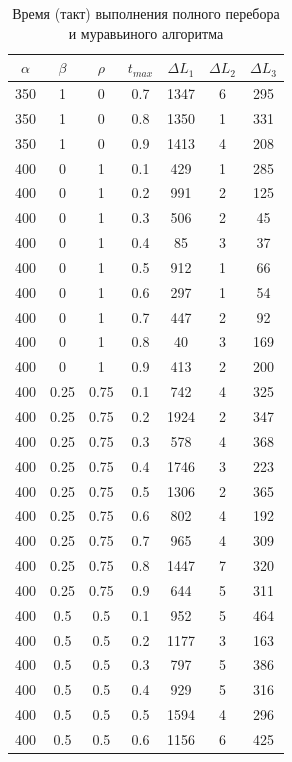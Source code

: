 \documentclass[a4paper,oneside,14pt]{extreport}
\begin{document}
\begin{table}[h]
\caption{Время (такт) выполнения полного перебора и муравьиного алгоритма}
\label{tbl:only}
\begin{center}
	\begin{tabular}{|c|c|c|c|c|c|c|}
		\hline
		$\alpha$ & $\beta$ &$\rho$ &  $t_{max}$ & $\Delta L_{1}$ & $\Delta L_{2}$ & $\Delta L_{3}$\\
		\hline
		350 & 1 & 0 & 0.7 & 1347 & 6 & 295 \\
		350 & 1 & 0 & 0.8 & 1350 & 1 & 331 \\
		350 & 1 & 0 & 0.9 & 1413 & 4 & 208 \\
		400 & 0 & 1 & 0.1 & 429 & 1 & 285 \\
		400 & 0 & 1 & 0.2 & 991 & 2 & 125 \\
		400 & 0 & 1 & 0.3 & 506 & 2 & 45 \\
		400 & 0 & 1 & 0.4 & 85 & 3 & 37 \\
		400 & 0 & 1 & 0.5 & 912 & 1 & 66 \\
		400 & 0 & 1 & 0.6 & 297 & 1 & 54 \\
		400 & 0 & 1 & 0.7 & 447 & 2 & 92 \\
		400 & 0 & 1 & 0.8 & 40 & 3 & 169 \\
		400 & 0 & 1 & 0.9 & 413 & 2 & 200 \\
		400 & 0.25 & 0.75 & 0.1 & 742 & 4 & 325 \\
		400 & 0.25 & 0.75 & 0.2 & 1924 & 2 & 347 \\
		400 & 0.25 & 0.75 & 0.3 & 578 & 4 & 368 \\
		400 & 0.25 & 0.75 & 0.4 & 1746 & 3 & 223 \\
		400 & 0.25 & 0.75 & 0.5 & 1306 & 2 & 365 \\
		400 & 0.25 & 0.75 & 0.6 & 802 & 4 & 192 \\
		400 & 0.25 & 0.75 & 0.7 & 965 & 4 & 309 \\
		400 & 0.25 & 0.75 & 0.8 & 1447 & 7 & 320 \\
		400 & 0.25 & 0.75 & 0.9 & 644 & 5 & 311 \\
		400 & 0.5 & 0.5 & 0.1 & 952 & 5 & 464 \\
		400 & 0.5 & 0.5 & 0.2 & 1177 & 3 & 163 \\
		400 & 0.5 & 0.5 & 0.3 & 797 & 5 & 386 \\
		400 & 0.5 & 0.5 & 0.4 & 929 & 5 & 316 \\
		400 & 0.5 & 0.5 & 0.5 & 1594 & 4 & 296 \\
		400 & 0.5 & 0.5 & 0.6 & 1156 & 6 & 425 \\

\end{tabular}
\end{center}
\end{table}
\end{document}
